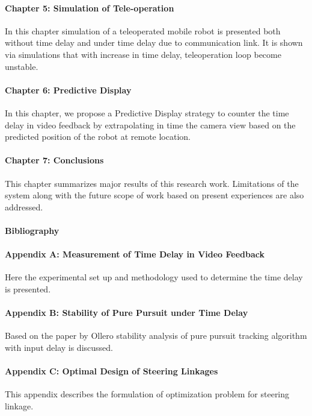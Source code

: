 \paragraph*{Chapter 5: Simulation of Tele-operation \\}
In this chapter simulation of a teleoperated mobile robot is presented both without time delay and  under time delay due to communication link. It is shown via simulations that with increase in time delay,  teleoperation loop become unstable. 
 
\paragraph*{Chapter 6: Predictive Display \\}
In this chapter,  we propose a Predictive Display strategy to counter the time delay in video feedback by extrapolating in time  the camera view based on the predicted position of the robot at remote location. 

\paragraph*{Chapter 7: Conclusions\\}
This chapter summarizes major results of this research work. Limitations of the system along with the future scope of work based on present experiences are also addressed.


\paragraph*{Bibliography}
\paragraph*{Appendix A:  Measurement of Time Delay in Video Feedback  \\}
Here the experimental set up and methodology used to determine the time delay is presented.
\paragraph*{Appendix B:  Stability of Pure Pursuit  under Time Delay \\}
Based on the paper by Ollero \cite{ollero1995stability} stability analysis of pure pursuit tracking algorithm with input delay is discussed.
\paragraph*{Appendix C:  Optimal Design of Steering Linkages \\} 
This appendix describes the formulation of optimization problem for steering linkage.